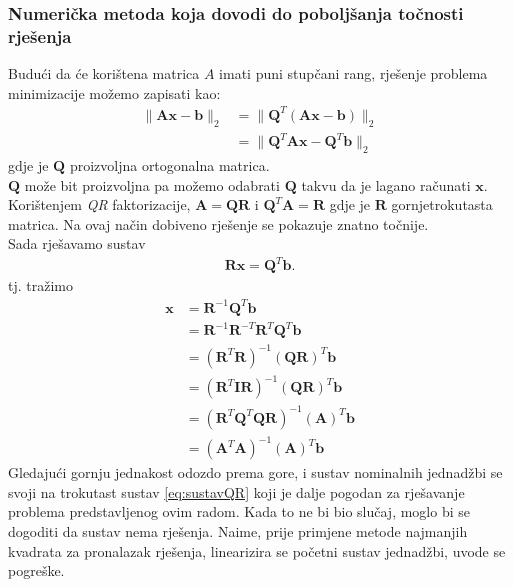 \documentclass[a4paper,twoside,12pt]{memoir} %
\begin{document}
\subsubsection{Numerička metoda koja dovodi do poboljšanja točnosti rješenja}
Budući da će korištena matrica $A$ imati puni stupčani rang, rješenje problema minimizacije možemo zapisati kao:
\begin{align}
\| \mathbf{A}\mathbf{x} - \mathbf{b} \|_2	
& = \| \mathbf{Q}^T(\mathbf{A}\mathbf{x} - \mathbf{b}) \|_2 \\
& = \| \mathbf{Q}^T \mathbf{A}\mathbf{x} - \mathbf{Q}^T \mathbf{b} \|_2	
\end{align}
gdje je $\mathbf{Q}$ proizvoljna ortogonalna matrica.\\
$\mathbf{Q}$ može bit proizvoljna pa možemo odabrati $\mathbf{Q}$ takvu da je lagano računati $\mathbf{x}$.
Korištenjem \textit{QR} faktorizacije, $\mathbf{A} = \mathbf{QR}$ i $\mathbf{Q}^T\mathbf{A} = \mathbf{R}$ gdje je $\mathbf{R}$ gornjetrokutasta matrica.
Na ovaj način dobiveno rješenje se pokazuje znatno točnije.\\
Sada rješavamo sustav
\begin{align}\label{eq:sustavQR}
\mathbf{R}\mathbf{x} = \mathbf{Q}^T\mathbf{b}.
\end{align}
tj. tražimo  
\begin{align*}
\mathbf{x} & = \mathbf{R}^{-1}\mathbf{Q}^T\mathbf{b} \\
& = \mathbf{R}^{-1}\mathbf{R}^{-T}\mathbf{R}^{T}\mathbf{Q}^T\mathbf{b} \\
& = (\mathbf{R}^{T}\mathbf{R})^{-1}(\mathbf{QR})^{T}\mathbf{b} \\
& = (\mathbf{R}^{T} \mathbf{I} \mathbf{R})^{-1}(\mathbf{QR})^{T}\mathbf{b}  \\
& = (\mathbf{R}^{T} \mathbf{Q}^T\mathbf{Q} \mathbf{R})^{-1}(\mathbf{A})^{T}\mathbf{b} \\
& = (\mathbf{A}^{T}\mathbf{A})^{-1}(\mathbf{A})^{T}\mathbf{b}
\end{align*}
Gledajući gornju jednakost odozdo prema gore, i sustav nominalnih jednadžbi se svoji na trokutast sustav \ref{eq:sustavQR} koji je dalje pogodan za rješavanje problema predstavljenog ovim radom.
Kada to ne bi bio slučaj, moglo bi se dogoditi da sustav nema rješenja. Naime, prije primjene metode najmanjih kvadrata za pronalazak rješenja, linearizira se početni sustav jednadžbi, uvode se pogreške.
\end{document}
